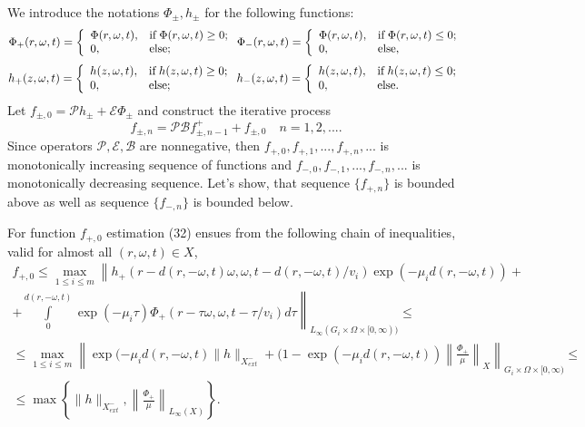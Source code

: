 \documentclass[12pt,reqno]{report}
\begin{document}
We introduce the notations $\Phi_{\pm},h_{\pm}$ for the following functions:
$$
\Phi_{+}(r,\omega,t)=\left\{%
\begin{array}{ll}
\Phi(r,\omega,t), & \hbox{if}\; \Phi(r,\omega,t)\geq 0;\\
0, & \hbox{else;} \\
\end{array}%
\right.
\Phi_{-}(r,\omega,t)=\left\{%
\begin{array}{ll}
\Phi(r,\omega,t), & \hbox{if} \;\Phi(r,\omega,t)\leq 0; \\
0, & \hbox{else,} \\
\end{array}%
\right.
$$
$$
h_{+}(z,\omega,t)=\left\{%
\begin{array}{ll}
h(z,\omega,t), & \hbox{if}\; h(z,\omega,t)\geq 0;\\
0, & \hbox{else;} \\
\end{array}%
\right.
h_{-}(z,\omega,t)=\left\{%
\begin{array}{ll}
h(z,\omega,t), & \hbox{if} \;h(z,\omega,t)\leq 0; \\
0, & \hbox{else.} \\
\end{array}%
\right.
$$
Let $f_{\pm,0}={\mathcal P} h_{\pm} + {\mathcal E}
\Phi_{\pm}$ and construct the iterative process
\begin{equation}
f_{\pm,n}= \mathcal P \mathcal B f^+_{\pm,n-1} + f_{\pm,0} \quad
n=1,2,....
\end{equation}
Since operators $\mathcal P,\mathcal E, \mathcal B$
are nonnegative, then $f_{+,0}, f_{+,1},..., f_{+,n},...$ is 
monotonically increasing sequence of functions and $f_{-,0},
f_{-,1},..., f_{-,n},...$ is monotonically decreasing sequence. 
Let's show, that sequence $\{f_{+,n} \}$ is bounded above as well as
sequence $\{f_{-,n} \}$ is bounded below.

For function $f_{+,0}$ estimation (32) ensues from the following chain of inequalities, 
valid for almost all $(r,\omega,t)\in X$,
\begin{multline}
f_{+,0} \leq \max \limits_{1\leq i \leq m} \left \|
h_{+}(r-d(r,-\omega,t)\omega,\omega,t-d(r,-\omega,t)/v_i) \exp \left(-
\mu_i d(r,-\omega,t)\right) + \right.
\\
\left. +
\int \limits_0^{d(r,-\omega,t)} \exp \left(- \mu_i \tau
\right)
\Phi_+(r-\tau\omega,\omega,t-\tau/v_i) d\tau \right \|_{L_{\infty}(G_i \times \Omega \times [0,\infty))}
\leq \\
\leq \max \limits_{1\leq i \leq m} \left \| \exp (- \mu_i
d(r,-\omega,t) \|h\|_{X^-_{ext}} + (1- \exp (- \mu_i
d(r,-\omega,t)) \left\|\frac{\Phi_+}{\mu} \right\|_{X}
\right\|_{G_i \times \Omega \times [0,\infty)} \leq \\ \leq \max
\left\{\|h\|_{X^-_{ext}}, \left\|\frac{\Phi_+}{\mu} \right\|_{L_{\infty}(X)}
\right\}.
\end{multline}
\end{document}
